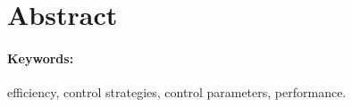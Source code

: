 
\section*{Abstract}
\label{sec:Abstract}


\paragraph{\textbf{Keywords:}} efficiency, control strategies, control parameters, performance.




